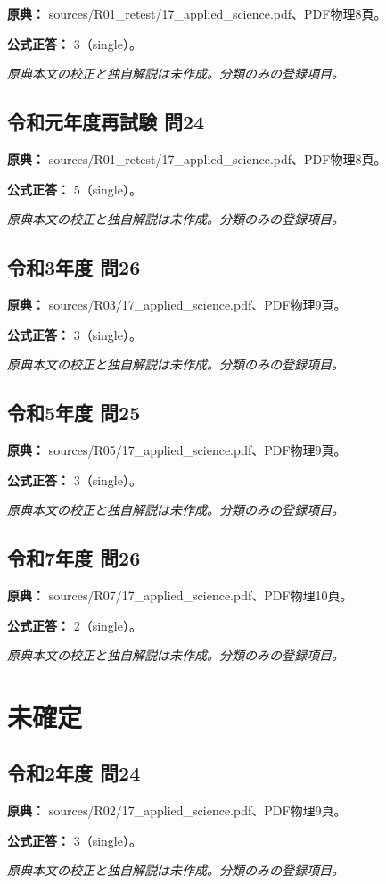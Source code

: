 \noindent\textbf{原典：} sources/R01\_retest/17\_applied\_science.pdf、PDF物理8頁。

\textbf{公式正答：} 3（single）。

\par\textit{原典本文の校正と独自解説は未作成。分類のみの登録項目。}

\subsection{令和元年度再試験 問24}
\label{q:r01-ret-applied-24}

\noindent\textbf{原典：} sources/R01\_retest/17\_applied\_science.pdf、PDF物理8頁。

\textbf{公式正答：} 5（single）。

\par\textit{原典本文の校正と独自解説は未作成。分類のみの登録項目。}

\subsection{令和3年度 問26}
\label{q:r03-reg-applied-26}

\noindent\textbf{原典：} sources/R03/17\_applied\_science.pdf、PDF物理9頁。

\textbf{公式正答：} 3（single）。

\par\textit{原典本文の校正と独自解説は未作成。分類のみの登録項目。}

\subsection{令和5年度 問25}
\label{q:r05-reg-applied-25}

\noindent\textbf{原典：} sources/R05/17\_applied\_science.pdf、PDF物理9頁。

\textbf{公式正答：} 3（single）。

\par\textit{原典本文の校正と独自解説は未作成。分類のみの登録項目。}

\subsection{令和7年度 問26}
\label{q:r07-reg-applied-26}

\noindent\textbf{原典：} sources/R07/17\_applied\_science.pdf、PDF物理10頁。

\textbf{公式正答：} 2（single）。

\par\textit{原典本文の校正と独自解説は未作成。分類のみの登録項目。}

\section{未確定}

\subsection{令和2年度 問24}
\label{q:r02-reg-applied-24}

\noindent\textbf{原典：} sources/R02/17\_applied\_science.pdf、PDF物理9頁。

\textbf{公式正答：} 3（single）。

\par\textit{原典本文の校正と独自解説は未作成。分類のみの登録項目。}
